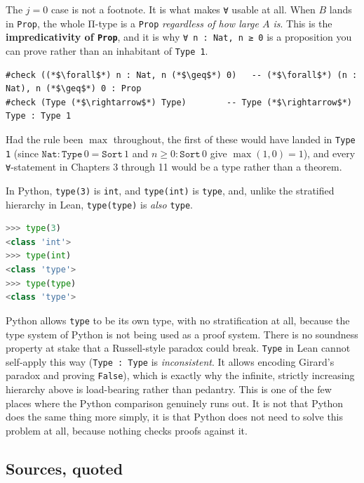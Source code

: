 The \(j = 0\) case is not a footnote. It is what makes \texttt{∀} usable at all. When \(B\) lands in \texttt{Prop}, the whole Π-type is a \texttt{Prop} \emph{regardless of how large \(A\) is}. This is the \textbf{impredicativity of \texttt{Prop}}, and it is why \texttt{∀ n : Nat, n ≥ 0} is a proposition you can prove rather than an inhabitant of \texttt{Type 1}.

\begin{lstlisting}
#check ((*$\forall$*) n : Nat, n (*$\geq$*) 0)   -- (*$\forall$*) (n : Nat), n (*$\geq$*) 0 : Prop
#check (Type (*$\rightarrow$*) Type)        -- Type (*$\rightarrow$*) Type : Type 1
\end{lstlisting}

Had the rule been \(\max\) throughout, the first of these would have landed in \texttt{Type 1} (since \(\mathtt{Nat} : \mathtt{Type}\,0 = \mathtt{Sort}\,1\) and \(n \ge 0 : \mathtt{Sort}\,0\) give \(\max(1,0) = 1\)), and every \texttt{∀}-statement in Chapters 3 through 11 would be a type rather than a theorem.

\begin{progcorner}

In Python, \texttt{type(3)} is \texttt{int}, and \texttt{type(int)} is \texttt{type}, and, unlike the stratified hierarchy in Lean, \texttt{type(type)} is \emph{also} \texttt{type}.

\end{progcorner}

\begin{lstlisting}[language=Python,style=python]
>>> type(3)
<class 'int'>
>>> type(int)
<class 'type'>
>>> type(type)
<class 'type'>
\end{lstlisting}

Python allows \texttt{type} to be its own type, with no stratification at all, because the type system of Python is not being used as a proof system. There is no soundness property at stake that a Russell-style paradox could break. \texttt{Type} in Lean cannot self-apply this way (\texttt{Type : Type} is \emph{inconsistent}. It allows encoding Girard's paradox and proving \texttt{False}), which is exactly why the infinite, strictly increasing hierarchy above is load-bearing rather than pedantry. This is one of the few places where the Python comparison genuinely runs out. It is not that Python does the same thing more simply, it is that Python does not need to solve this problem at all, because nothing checks proofs against it.

\subsection{Sources, quoted}\label{sec:05-rigor-check:03-typing-rules-and-safety:7}


